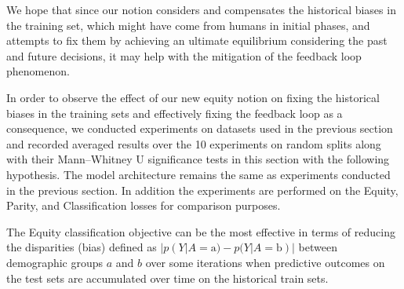 We hope that since our notion considers and compensates the historical biases in the training set, which might have come from humans in initial phases, and attempts to fix them by achieving an ultimate equilibrium considering the past and future decisions, it may help with the mitigation of the feedback loop phenomenon. %

In order to observe the effect of our new equity notion on fixing the historical biases in the training sets and effectively fixing the feedback loop as a consequence, we conducted experiments on datasets used in the previous section and recorded averaged results over the 10 experiments on random splits along with their Mann–Whitney U significance tests in this section with the following hypothesis. The model architecture remains the same as experiments conducted in the previous section. In addition the experiments are performed on the Equity, Parity, and Classification losses for comparison purposes.
\begin{tcolorbox}
\begin{hyp} 
The Equity classification objective can be the most effective in terms of reducing the disparities (bias) defined as $|p(Y|A=\text{a})-p(Y|A=\text{b})|$ between demographic groups $a$ and $b$ over some iterations when predictive outcomes on the test sets are accumulated over time on the historical train sets.
\end{hyp}
\end{tcolorbox}
